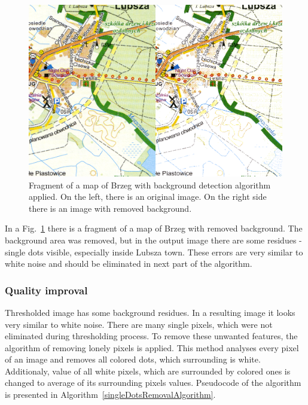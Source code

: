 \documentclass[a4paper,onecolumn,oneside,12pt]{memoir}
\begin{document}
\begin{figure}[!ht]
\begin{center}
\includegraphics[scale=2.0]{images/thresholdingResult.png}
\caption{Fragment of a map of Brzeg with background detection algorithm applied.
On the left, there is an original image. On the right side there is an image with removed
background.}
\label{thresholdingResult}
\end{center}
\end{figure}

In a Fig.~\ref{thresholdingResult} there is a fragment of a map of Brzeg with removed background.
The background area was removed, but in the output image there are some residues - single dots
visible, especially inside Lubsza town. These errors are very similar to white noise and should be
eliminated in next part of the algorithm.

\subsubsection{Quality improval}

Thresholded image has some background residues. In a resulting image it looks very similar to white
noise. There are many single pixels, which were not eliminated during thresholding process. To
remove these unwanted features, the algorithm of removing lonely pixels is applied. This method
analyses every pixel of an image and removes all colored dots, which surrounding is white.
Additionaly, value of all white pixels, which are surrounded by colored ones is changed to average
of its surrounding pixels values. Pseudocode of the algorithm is presented in
Algorithm~\ref{singleDotsRemovalAlgorithm}.
\end{document}
